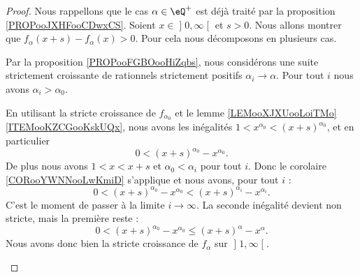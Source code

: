 \begin{proof}
	Nous rappellons que le cas \( \alpha\in \eQ^+\) est déjà traité par la proposition \ref{PROPooJXHFooCDwxCS}. Soient \( x\in \mathopen] 0 , \infty \mathclose[\) et \( s>0\). Nous allons montrer que \( f_{\alpha}(x+s)-f_{\alpha}(x)>0\). Pour cela nous décomposons en plusieurs cas.
	\begin{subproof}
		\spitem[\( x>1\)]
		Par la proposition \ref{PROPooFGBOooHiZqbs}, nous considérons une suite strictement croissante de rationnels strictement positifs \( \alpha_i\to \alpha\). Pour tout \( i\) nous avons \( \alpha_i>\alpha_0\).

		En utilisant la stricte croissance de \( f_{\alpha_0}\) et le lemme \ref{LEMooXJXUooLoiTMo}\ref{ITEMooKZCGooKskUQx}, nous avons les inégalités \( 1<x^{\alpha_0}<(x+s)^{\alpha_0}\), et en particulier
		\begin{equation}
			0<(x+s)^{\alpha_0}-x^{\alpha_0}.
		\end{equation}
		De plus nous avons \( 1<x<x+s\) et \( \alpha_0<\alpha_i\) pour tout \( i\). Donc le corolaire \ref{CORooYWNNooLwKmiD} s'applique et nous avons, pour tout \( i\) :
		\begin{equation}
			0<(x+s)^{\alpha_0}-x^{\alpha_0}<(x+s)^{\alpha_i}-x^{\alpha_i}.
		\end{equation}
		C'est le moment de passer à la limite \( i\to \infty\). La seconde inégalité devient non stricte, mais la première reste :
		\begin{equation}
			0<(x+s)^{\alpha_0}-x^{\alpha_0}\leq(x+s)^{\alpha}-x^{\alpha}.
		\end{equation}
		Nous avons donc bien la stricte croissance de \( f_{\alpha}\) sur \( \mathopen] 1 , \infty \mathclose[\).


\end{subproof}
\end{proof}
